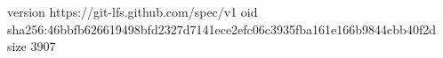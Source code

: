 version https://git-lfs.github.com/spec/v1
oid sha256:46bbfb626619498bfd2327d7141ece2efc06c3935fba161e166b9844cbb40f2d
size 3907
